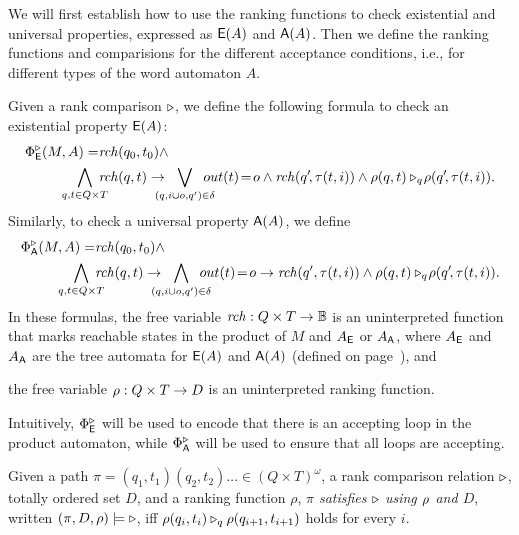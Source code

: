 We will first establish how to use the ranking functions
to check existential and universal properties,
expressed as ${\operatorname{\mathsf{E}}}(A)$ and ${\operatorname{\mathsf{A}}}(A)$.
Then we define the ranking functions and comparisions for the different acceptance conditions,
i.e., for different types of the word automaton $A$.

Given a rank comparison $\triangleright$,
we define the following formula to check an existential property ${\operatorname{\mathsf{E}}}(A)$:
\begin{equation*}\label{eq:nondet}
\begin{aligned}
\PhiE(M,A) = & \reach(q_0,t_0) \land \\
\bigwedge_{q,t \in Q\times T} \mkern-12mu &\reach(q,t) \impl \mkern-18mu 
\bigvee_{(q,i \cup o, q') \in \delta} \mkern-18mu 
out(t)\!=\!o \land \reach(q'\!,\tau(t,i)) \land \rank(q,t)\triangleright_q\! \rank(q'\!,\tau(t,i)).
\end{aligned}
\end{equation*}
Similarly, to check a universal property ${\operatorname{\mathsf{A}}}(A)$, we define
\begin{equation*}\label{eq:universal}
\begin{aligned}
\PhiA(M,A) = & \reach(q_0,t_0) \land \\
\bigwedge_{q,t \in Q\times T}\mkern-12mu & \reach(q,t) \impl\mkern-18mu
\bigwedge_{(q,i \cup o, q') \in \delta}\mkern-18mu 
out(t)\!=\!o \impl \reach(q',\tau(t,i)) \land \rank(q,t)\triangleright_q\! \rank(q'\!,\tau(t,i)).
\end{aligned}
\end{equation*}
In these formulas,
\li 
\- the free variable $\mathit{rch}: Q\times T \to \mathbb{B}$
   is an uninterpreted function that marks reachable states
   in the product of $M$ and $A_{\operatorname{\mathsf{E}}}$ or $A_{\operatorname{\mathsf{A}}}$,
   where $A_{\operatorname{\mathsf{E}}}$ and $A_{\operatorname{\mathsf{A}}}$ are the tree automata for ${\operatorname{\mathsf{E}}}(A)$ and ${\operatorname{\mathsf{A}}}(A)$
   (defined on page~\pageref{page:defs:tree_variants}),
   and

\- the free variable $\rho: Q\times T \to D$ is an uninterpreted ranking function. 
\il

Intuitively,
$\Phi^{\triangleright}_{\operatorname{\mathsf{E}}}$ will be used to encode that there is an accepting loop in the product automaton,
while $\Phi^{\triangleright}_{\operatorname{\mathsf{A}}}$ will be used to ensure that all loops are accepting.

Given a path $\pi=(q_1,t_1) (q_2,t_2)\dots \in (Q \times T)^\omega$,
a rank comparison relation $\triangleright$,
totally ordered set $D$, and
a ranking function $\rho$,
\emph{$\pi$ satisfies $\triangleright$ using $\rho$ and $D$},
written $(\pi,D,\rho) \models \triangleright$,
iff
$\rho(q_i,t_i) \triangleright_q \rho(q_{i+1},t_{i+1})$ holds for every $i$.

